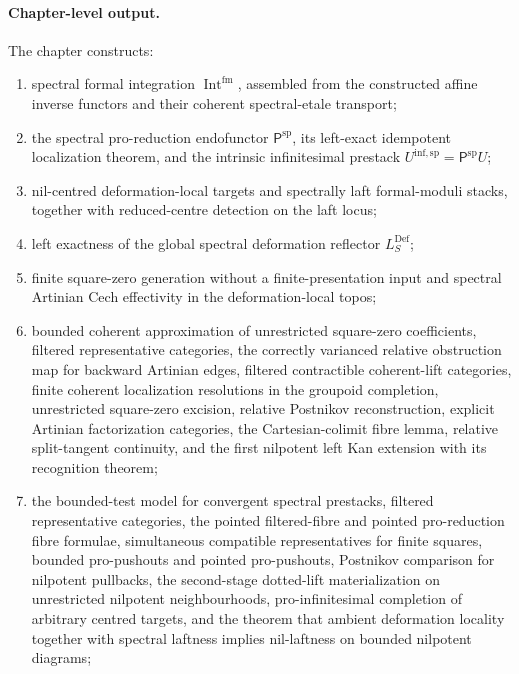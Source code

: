 \paragraph{Chapter-level output.}
The chapter constructs:
\begin{enumerate}
    \item spectral formal integration $\operatorname{Int}^{\mathrm{fm}}$, assembled
    from the constructed affine inverse functors and their coherent
    spectral-etale transport;
    \item the spectral pro-reduction endofunctor
    $\mathsf P^{\mathrm{sp}}$, its left-exact idempotent localization theorem,
    and the intrinsic infinitesimal prestack
    $U^{\mathrm{inf,sp}}=\mathsf P^{\mathrm{sp}}U$;
    \item nil-centred deformation-local targets and spectrally laft
    formal-moduli stacks, together with reduced-centre detection on the laft
    locus;
    \item left exactness of the global spectral deformation reflector
    $L_S^{\mathrm{Def}}$;
    \item finite square-zero generation without a finite-presentation input
    and spectral Artinian Cech effectivity in the deformation-local topos;
    \item bounded coherent approximation of unrestricted square-zero
    coefficients, filtered representative categories, the correctly varianced
    relative obstruction map for backward Artinian edges, filtered contractible
    coherent-lift categories,
    finite coherent localization resolutions in the groupoid completion, unrestricted
    square-zero excision, relative Postnikov reconstruction, explicit Artinian
    factorization categories, the Cartesian-colimit fibre lemma, relative
    split-tangent continuity, and the first nilpotent left Kan extension with
    its recognition theorem;
    \item the bounded-test model for convergent spectral prestacks, filtered
    representative categories, the pointed filtered-fibre and pointed
    pro-reduction fibre formulae, simultaneous compatible representatives for
    finite squares, bounded pro-pushouts and pointed pro-pushouts, Postnikov
    comparison for nilpotent pullbacks, the second-stage
    dotted-lift materialization on unrestricted
    nilpotent neighbourhoods, pro-infinitesimal completion of arbitrary
    centred targets, and the theorem that ambient deformation locality together with spectral laftness
    implies nil-laftness on bounded nilpotent diagrams;

\end{enumerate}
